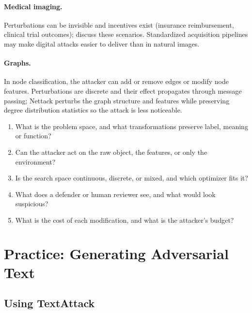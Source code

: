 \documentclass[10pt,a4paper]{extarticle}
\theoremstyle{definition}
\begin{document}
\paragraph{Medical imaging.} Perturbations can be invisible and incentives exist (insurance reimbursement, clinical trial outcomes); \citet{finlayson2019medical} discuss these scenarios. Standardized acquisition pipelines may make digital attacks easier to deliver than in natural images.

\paragraph{Graphs.} In node classification, the attacker can add or remove edges or modify node features. Perturbations are discrete and their effect propagates through message passing; Nettack \citep{zugner2018nettack} perturbs the graph structure and features while preserving degree distribution statistics so the attack is less noticeable.

\begin{keybox}
\begin{enumerate}
  \item What is the problem space, and what transformations preserve label, meaning or function?
  \item Can the attacker act on the raw object, the features, or only the environment?
  \item Is the search space continuous, discrete, or mixed, and which optimizer fits it?
  \item What does a defender or human reviewer see, and what would look suspicious?
  \item What is the cost of each modification, and what is the attacker's budget?
\end{enumerate}
\end{keybox}

\section{Practice: Generating Adversarial Text}

\subsection{Using TextAttack}
\end{document}
